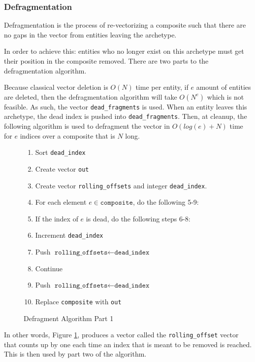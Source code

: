 \subsubsection{Defragmentation}
Defragmentation is the process of re-vectorizing a composite such that there are no gaps in the vector from entities leaving the archetype. 

In order to achieve this: entities who no longer exist on this archetype must get their position in the composite removed. There are two parts to the defragmentation algorithm.

Because classical vector deletion is $O(N)$ time per entity, if $e$ amount of entities are deleted, then the defragmentation algorithm will take $O(N^e)$ which is not feasible. As such, the vector \texttt{dead\_fragments} is used. When an entity leaves this archetype, the dead index is pushed into \texttt{dead\_fragments}. Then, at cleanup, the following algorithm is used to defragment the vector in $O(log(e) + N)$ time for $e$ indices over a composite that is $N$ long.

\begin{figure}[H]
    \begin{enumerate}
        \item Sort \texttt{dead\_index}
        \item Create vector \texttt{out}
        \item Create vector \texttt{rolling\_offsets} and integer \texttt{dead\_index}.
        \item For each element $ e \in \texttt{composite}$, do the following 5-9:
        \item If the index of $e$ is dead, do the following steps 6-8:
        \item Increment \texttt{dead\_index}
        \item Push $\texttt{rolling\_offsets} \leftarrow \texttt{dead\_index}$
        \item Continue
        \item Push $\texttt{rolling\_offsets} \leftarrow \texttt{dead\_index}$
        \item Replace \texttt{composite} with \texttt{out}
    \end{enumerate}
    \caption{Defragment Algorithm Part 1}
    \label{alg:defrag1}
\end{figure}

In other words, Figure \ref{alg:defrag1}, produces a vector called the \texttt{rolling\_offset} vector that counts up by one each time an index that is meant to be removed is reached. This is then used by part two of the algorithm.
                  
